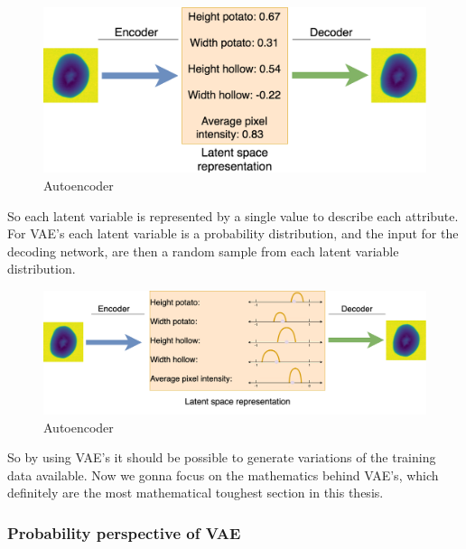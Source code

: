 \documentclass[11pt]{article}
\begin{document}
\begin{figure}[!h]
    \centering
    \includegraphics[scale=0.25]{figurer/vae/vae_intution.png}
    \caption{Autoencoder}
    \label{fig:generative_models_vae_intution}
\end{figure}
So each latent variable is represented by a single value to describe each attribute. For VAE's each latent variable is a probability distribution, and the input for the decoding network, are then a random sample from each latent variable distribution.

\begin{figure}[!h]
    \centering
    \includegraphics[scale=0.25]{figurer/vae/vae_intu3.png}
    \caption{Autoencoder}
    \label{fig:generative_models_vae_intution_3}
\end{figure}

So by using VAE's it should be possible to generate variations of the training data available. Now we gonna focus on the mathematics behind VAE's, which definitely are the most mathematical toughest section in this thesis.

\subsubsection{Probability perspective of VAE}
\end{document}
